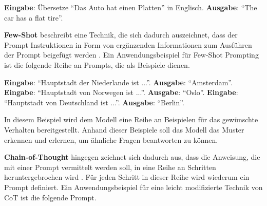 \begin{tcolorbox}[colback=white, top=1pt, bottom=1pt, left=2pt]
    \textbf{Eingabe}: Übersetze \enquote{Das Auto hat einen Platten} in Englisch.
    \tcbline
    \textbf{Ausgabe}: \enquote{The car has a flat tire}.
\end{tcolorbox}

\textbf{Few-Shot} beschreibt eine Technik, die sich dadurch auszeichnet, dass der Prompt Instruktionen in Form von ergänzenden Informationen zum Ausführen der Prompt beigefügt werden \cite{promptingguide-few-shot}.
Ein Anwendungsbeispiel für Few-Shot Prompting ist die folgende Reihe an Prompts, die als Beispiele dienen.

\begin{tcolorbox}[colback=white, top=1pt, bottom=1pt, left=2pt]
    \textbf{Eingabe}: \enquote{Hauptstadt der Niederlande ist ...}. \newline
    \textbf{Ausgabe}: \enquote{Amsterdam}. \newline
    \textbf{Eingabe}: \enquote{Hauptstadt von Norwegen ist ...}. \newline
    \textbf{Ausgabe}: \enquote{Oslo}. \newline
    \textbf{Eingabe}: \enquote{Hauptstadt von Deutschland ist ...}.
    \tcbline
    \textbf{Ausgabe}: \enquote{Berlin}.
\end{tcolorbox}
In diesem Beispiel wird dem Modell eine Reihe an Beispielen für das gewünschte Verhalten bereitgestellt.
Anhand dieser Beispiele soll das Modell das Muster erkennen und erlernen, um ähnliche Fragen beantworten zu können.

\textbf{Chain-of-Thought} hingegen zeichnet sich dadurch aus, dass die Anweisung, die mit einer Prompt vermittelt werden soll, in eine Reihe an Schritten heruntergebrochen wird \cite{google-cot}.
Für jeden Schritt in dieser Reihe wird wiederum ein Prompt definiert.
Ein Anwendungsbeispiel für eine leicht modifizierte Technik von CoT ist die folgende Prompt.

